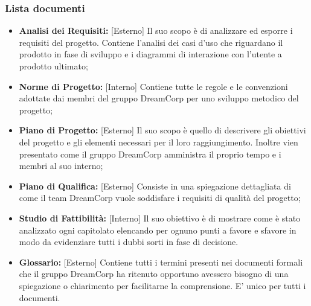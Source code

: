 		\subsubsection{Lista documenti}
		\label{3.1.5}
			\begin{itemize}
				\item \textbf{Analisi dei Requisiti: }[Esterno] \newline
				Il suo scopo è di analizzare ed esporre i requisiti del progetto. Contiene l'analisi dei casi d'uso che riguardano il prodotto in fase di sviluppo e i diagrammi di interazione con l'utente a prodotto ultimato;
				\item \textbf{Norme di Progetto: }[Interno] \newline
				Contiene tutte le regole e le convenzioni adottate dai membri del gruppo DreamCorp per uno sviluppo metodico del progetto;
				\item \textbf{Piano di Progetto: }[Esterno] \newline
				Il suo scopo è quello di descrivere gli obiettivi del progetto e gli elementi necessari per il loro raggiungimento. Inoltre vien presentato come il gruppo DreamCorp amministra il proprio tempo e i membri al suo interno;
				\item \textbf{Piano di Qualifica: }[Esterno] \newline
				Consiste in una spiegazione dettagliata di come il team DreamCorp vuole soddisfare i requisiti di qualità del progetto;
				\item \textbf{Studio di Fattibilità: }[Interno] \newline
				Il suo obiettivo è di mostrare come è stato analizzato ogni capitolato elencando per ognuno punti a favore e sfavore in modo da evidenziare tutti i dubbi sorti in fase di decisione.
				\item \textbf{Glossario: }[Esterno] \newline
				Contiene tutti i termini presenti nei documenti formali che il gruppo DreamCorp ha ritenuto opportuno avessero bisogno di una spiegazione o chiarimento per facilitarne la comprensione. E' unico per tutti i documenti.
			\end{itemize}
